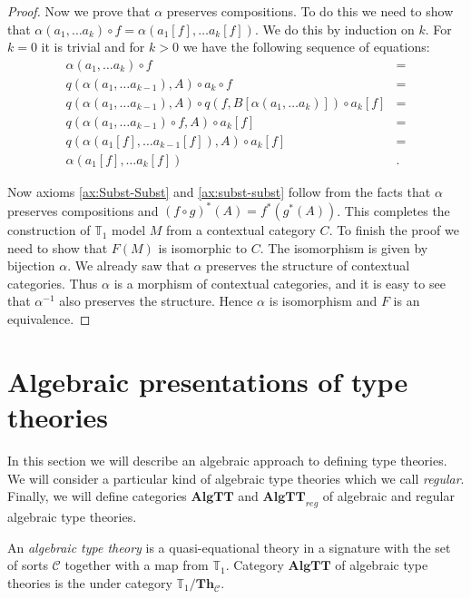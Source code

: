 \documentclass[reqno]{amsart}
\theoremstyle{definition}
\theoremstyle{remark}
\newcommand{\cat}[1]{\mathbf{#1}}
\newcommand{\algtt}{\cat{AlgTT}}
\numberwithin{figure}{section}
\begin{document}
\begin{proof}
Now we prove that $\alpha$ preserves compositions.
To do this we need to show that $\alpha(a_1, \ldots a_k) \circ f = \alpha(a_1[f], \ldots a_k[f])$.
We do this by induction on $k$.
For $k = 0$ it is trivial and for $k > 0$ we have the following sequence of equations:
\begin{align*}
\alpha(a_1, \ldots a_k) \circ f & = \\
q(\alpha(a_1, \ldots a_{k-1}), A) \circ a_k \circ f & = \\
q(\alpha(a_1, \ldots a_{k-1}), A) \circ q(f, B[\alpha(a_1, \ldots a_k)]) \circ a_k[f] & = \\
q(\alpha(a_1, \ldots a_{k-1}) \circ f, A) \circ a_k[f] & = \\
q(\alpha(a_1[f], \ldots a_{k-1}[f]), A) \circ a_k[f] & = \\
\alpha(a_1[f], \ldots a_k[f]) & .
\end{align*}

Now axioms \eqref{ax:Subst-Subst} and \eqref{ax:subst-subst} follow from the facts that $\alpha$ preserves compositions and $(f \circ g)^*(A) = f^*(g^*(A))$.
This completes the construction of $\mathbb{T}_1$ model $M$ from a contextual category $C$.
To finish the proof we need to show that $F(M)$ is isomorphic to $C$.
The isomorphism is given by bijection $\alpha$.
We already saw that $\alpha$ preserves the structure of contextual categories.
Thus $\alpha$ is a morphism of contextual categories, and it is easy to see that $\alpha^{-1}$ also preserves the structure.
Hence $\alpha$ is isomorphism and $F$ is an equivalence.
\end{proof}

\section{Algebraic presentations of type theories}

In this section we will describe an algebraic approach to defining type theories.
We will consider a particular kind of algebraic type theories which we call \emph{regular}.
Finally, we will define categories $\algtt$ and $\algtt_{reg}$ of algebraic and regular algebraic type theories.

\begin{defn}
An \emph{algebraic type theory} is a quasi-equational theory in a signature with the set of sorts $\mathcal{C}$ together with a map from $\mathbb{T}_1$.
Category $\algtt$ of algebraic type theories is the under category $\mathbb{T}_1 / \cat{Th}_\mathcal{C}$.
\end{defn}
\end{document}
